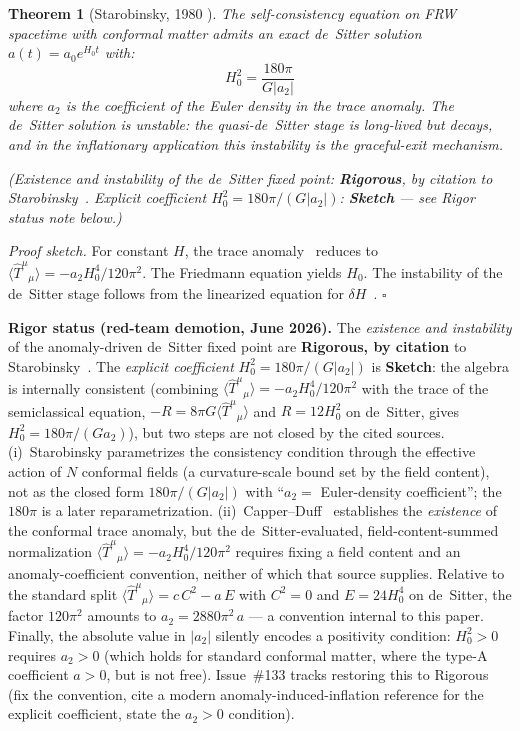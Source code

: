 \documentclass[12pt,a4paper]{article}
\newtheorem{theorem}{Theorem}
\begin{document}
\begin{theorem}[Starobinsky, 1980 \cite{starobinsky}]
The self-consistency equation on FRW spacetime with conformal matter admits an exact
de~Sitter solution $a(t) = a_0 e^{H_0 t}$ with:
\begin{equation}
H_0^2 = \frac{180\pi}{G|a_2|}
\end{equation}
where $a_2$ is the coefficient of the Euler density in the trace anomaly. The de~Sitter
solution is \emph{unstable}: the quasi-de~Sitter stage is long-lived but decays, and in
the inflationary application this instability is the graceful-exit mechanism.

\emph{(Existence and instability of the de~Sitter fixed point: \textbf{Rigorous}, by
citation to Starobinsky~\cite{starobinsky}. Explicit coefficient
$H_0^2 = 180\pi/(G|a_2|)$: \textbf{Sketch} --- see Rigor status note below.)}
\end{theorem}

\noindent\emph{Proof sketch.} For constant $H$, the trace anomaly~\cite{capper_duff}
reduces to $\langle\hat{T}^\mu{}_\mu\rangle = -a_2 H_0^4/120\pi^2$. The Friedmann
equation yields $H_0$. The instability of the de~Sitter stage follows from the linearized
equation for $\delta H$~\cite{starobinsky}. \hfill$\square$

\smallskip\noindent\textbf{Rigor status (red-team demotion, June 2026).} The
\emph{existence and instability} of the anomaly-driven de~Sitter fixed point are
\textbf{Rigorous, by citation} to Starobinsky~\cite{starobinsky}. The \emph{explicit
coefficient} $H_0^2 = 180\pi/(G|a_2|)$ is \textbf{Sketch}: the algebra is internally
consistent (combining $\langle\hat{T}^\mu{}_\mu\rangle = -a_2 H_0^4/120\pi^2$ with the
trace of the semiclassical equation, $-R = 8\pi G\langle\hat{T}^\mu{}_\mu\rangle$ and
$R = 12H_0^2$ on de~Sitter, gives $H_0^2 = 180\pi/(Ga_2)$), but two steps are not closed
by the cited sources. (i)~Starobinsky parametrizes the consistency condition through the
effective action of $N$ conformal fields (a curvature-scale bound set by the field content),
not as the closed form $180\pi/(G|a_2|)$ with ``$a_2 = $ Euler-density coefficient'';
the $180\pi$ is a later reparametrization. (ii)~Capper--Duff~\cite{capper_duff} establishes
the \emph{existence} of the conformal trace anomaly, but the de~Sitter-evaluated,
field-content-summed normalization $\langle\hat{T}^\mu{}_\mu\rangle = -a_2 H_0^4/120\pi^2$
requires fixing a field content and an anomaly-coefficient convention, neither of which that
source supplies. Relative to the standard split $\langle\hat{T}^\mu{}_\mu\rangle =
c\,C^2 - a\,E$ with $C^2 = 0$ and $E = 24H_0^4$ on de~Sitter, the factor $120\pi^2$ amounts
to $a_2 = 2880\pi^2\,a$ --- a convention internal to this paper. Finally, the absolute value
in $|a_2|$ silently encodes a positivity condition: $H_0^2 > 0$ requires $a_2 > 0$ (which
holds for standard conformal matter, where the type-A coefficient $a > 0$, but is not free).
Issue~\#133 tracks restoring this to Rigorous (fix the convention, cite a modern
anomaly-induced-inflation reference for the explicit coefficient, state the $a_2 > 0$
condition).
\end{document}
